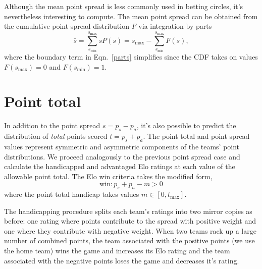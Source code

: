 \documentclass[aps,prc,reprint,amsmath,superscriptaddress]{revtex4-1}
\begin{document}
Although the mean point spread is less commonly used in betting circles, it's nevertheless interesting to compute.
The mean point spread can be obtained from the cumulative point spread distribution $F$ via integration by parts
\begin{equation}
  \label{parts}
  \bar{s} = \sum\limits_{s_\text{min}}^{s_\text{max}} s P(s) = s_\text{max} - \sum\limits_{s_\text{min}}^{s_\text{max}} F(s),
\end{equation}
where the boundary term in Eqn.~\ref{parts} simplifies since the CDF takes on values $F(s_\text{max})=0$ and $F(s_\text{min})=1$.

\section{Point total}

In addition to the point spread $s = p_s - p_a$, it's also possible to predict the distribution of \emph{total} points scored $t = p_s + p_a$.
The point total and point spread values represent symmetric and asymmetric components of the teams' point distributions. 
We proceed analogously to the previous point spread case and calculate the handicapped and advantaged Elo ratings at each value of the allowable point total. 
The Elo win criteria takes the modified form,
\begin{equation}
  \text{win}: p_s + p_a - m > 0
\end{equation}
where the point total handicap takes values $m \in [0, t_\text{max}]$.

The handicapping procedure splits each team's ratings into two mirror copies as before: one rating where points contribute to the spread with positive weight and one where they contribute with negative weight. 
When two teams rack up a large number of combined points, the team associated with the positive points (we use the home team) wins the game and increases its Elo rating and the team associated with the negative points loses the game and decreases it's rating.
\end{document}
